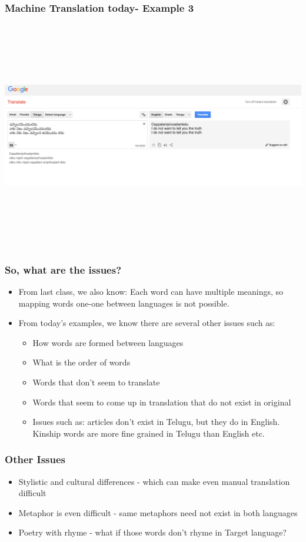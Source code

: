 \documentclass{beamer}
\begin{document}
\begin{frame}
\frametitle{Machine Translation today- Example 3}
\includegraphics[height=10cm,width=1.1\textwidth,keepaspectratio]{MTEngTelExample2}
\end{frame}

\begin{frame}
\frametitle{So, what are the issues?}
\begin{itemize}
\item From last class, we also know: Each word can have multiple meanings, so mapping words one-one between languages is not possible.
\item From today's examples, we know there are several other issues such as:
\begin{itemize}
\item How words are formed between languages
\item What is the order of words
\item Words that don't seem to translate
\item Words that seem to come up in translation that do not exist in original
\item Issues such as: articles don't exist in Telugu, but they do in English. Kinship words are more fine grained in Telugu than English etc. 
\end{itemize}
\end{itemize}
\end{frame}

\begin{frame}
\frametitle{Other Issues}
\begin{itemize}
\item Stylistic and cultural differences - which can make even manual translation difficult
\item Metaphor is even difficult - same metaphors need not exist in both languages
\item Poetry with rhyme - what if those words don't rhyme in Target language?
\end{itemize}
\end{frame}
\end{document}

